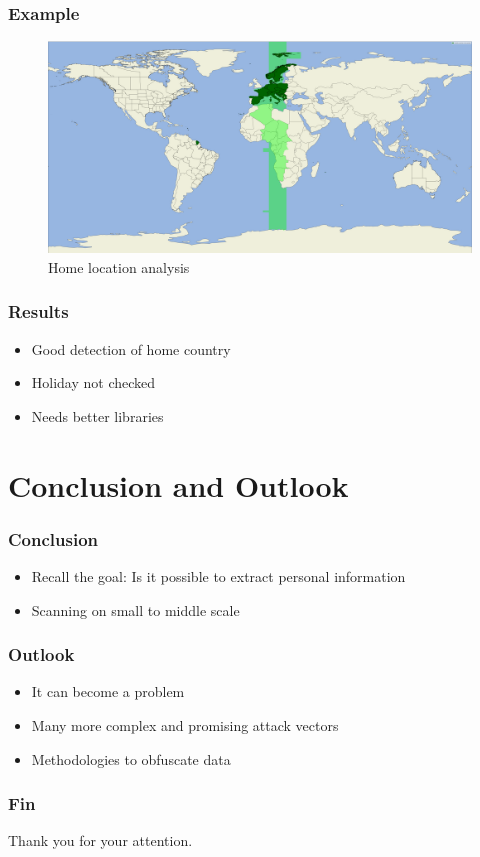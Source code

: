 \documentclass[t]{beamer}
\begin{document}
\begin{frame}
    \frametitle{Example}
    \begin{figure}[H]
        \includegraphics[scale=0.06]{analysis/author-home-location}
        \centering
        \caption{Home location analysis}
    \end{figure}
\end{frame}

\begin{frame}
    \frametitle{Results}
    \vspace{1cm}
    \begin{itemize}
        \item Good detection of home country
        \pause{}
        \item Holiday not checked
        \pause{}
        \item Needs better libraries
    \end{itemize}
\end{frame}

\section{Conclusion and Outlook}
\begin{frame}
    \frametitle{Conclusion}
    \vspace{1cm}
    \begin{itemize}
        \item Recall the goal: Is it possible to extract personal information
        \pause{}
        \item Scanning on small to middle scale
    \end{itemize}
\end{frame}

\begin{frame}
    \frametitle{Outlook}
    \vspace{1cm}
    \begin{itemize}
        \item It can become a problem
        \pause{}
        \item Many more complex and promising attack vectors
        \pause{}
        \item Methodologies to obfuscate data
    \end{itemize}
\end{frame}


\begin{frame}
    \frametitle{Fin}
    Thank you for your attention.
\end{frame}
\end{document}
